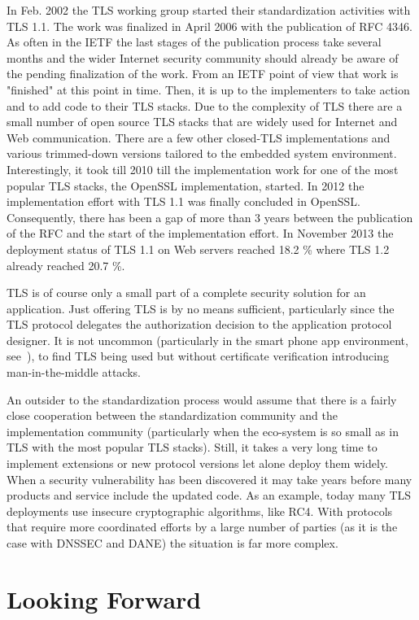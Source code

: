 \documentclass[peerreview, a4paper, 7pt]{IEEEtran}
\begin{document}
In Feb. 2002 the TLS working group started their standardization activities with TLS 1.1. The work was finalized in April 2006 with the publication of RFC 4346. As often in the IETF the last stages of the publication process take several months and the wider Internet security community should already be aware of the pending finalization of the work. From an IETF point of view that work is "finished" at this point in time. Then, it is up to the implementers to take action and to add code to their TLS stacks. Due to the complexity of TLS there are a small number of open source TLS stacks that are widely used for Internet and Web communication. There are a few other closed-TLS implementations and various trimmed-down versions tailored to the embedded system environment. Interestingly, it took till 2010 till the implementation work for one of the most popular TLS stacks, the OpenSSL implementation, started. In 2012 the implementation effort with TLS 1.1 was finally concluded in OpenSSL. Consequently, there has been a gap of more than 3 years between the publication of the RFC and the start of the implementation effort. In November 2013 the deployment status of TLS 1.1 on Web servers reached 18.2 \% where TLS 1.2 already reached 20.7 \%. 

TLS is of course only a small part of a complete security solution for an application. Just offering TLS is by no means sufficient, particularly since the TLS protocol delegates the authorization decision to the application protocol designer. It is not uncommon (particularly in the smart phone app environment, see~\cite{GI+02}), to find TLS being used but without certificate verification introducing man-in-the-middle attacks. 

An outsider to the standardization process would assume that there is a fairly close cooperation between the standardization community and the implementation community (particularly when the eco-system is so small as in TLS with the most popular TLS stacks). Still, it takes a very long time to implement extensions or new protocol versions let alone deploy them widely. When a security vulnerability has been discovered it may take years before many products and service include the updated code. As an example, today many TLS deployments use insecure cryptographic algorithms, like RC4. With protocols that require more coordinated efforts by a large number of parties (as it is the case with DNSSEC and DANE) the situation is far more complex.  

\section{Looking Forward}
\end{document}
